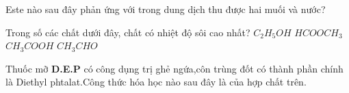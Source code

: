 \begin{vdex}
	Este nào sau đây phản ứng với  trong dung dịch thu được hai muối và nước?
	\choice
	{%
		\True {}
	}
	{%
	}
	{%
	}
	{%
	}
		\huongdan{%
		
	}
\end{vdex}


\begin{vdex}
	Trong số các chất dưới đây, chất có nhiệt độ sôi cao nhất?
	\choice
	{%
		$ C_2H_5OH $
	}
	{%
		$ HCOOCH_3 $
	}
	{%
	\True$ CH_3COOH $
	}
	{%
		$ CH_3CHO $
	}
		\huongdan{%
		
	}
\end{vdex}


\begin{vdex}
	Thuốc mỡ \textbf{D.E.P} có công dụng trị ghẻ ngứa,côn trùng đốt có thành phần chính là Diethyl phtalat.Công thức hóa học nào sau đây là của hợp chất trên.
	\choice
	{%
	\True {}	
	}
	{%
	}
	{%
	}
	{%
	}
		\huongdan{%
		
	}
\end{vdex}


